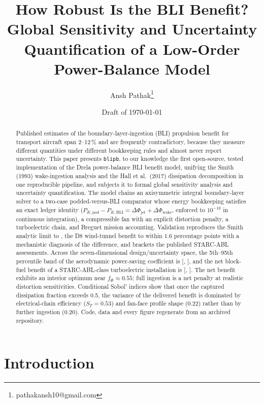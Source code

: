\documentclass[10pt]{article}
\title{How Robust Is the BLI Benefit?\\
\large Global Sensitivity and Uncertainty Quantification of a Low-Order
Power-Balance Model}
\author{Ansh Pathak\thanks{pathakansh10@gmail.com}}
\date{Draft of \today}
\begin{document}
\maketitle

\begin{abstract}
\noindent
Published estimates of the boundary-layer-ingestion (BLI) propulsion benefit
for transport aircraft span 2--12\,\% and are frequently contradictory,
because they measure different quantities under different bookkeeping rules
and almost never report uncertainty. This paper presents \texttt{blipb},
to our knowledge the first open-source, tested implementation of the Drela
power-balance BLI
benefit model, unifying the Smith (1993) wake-ingestion analysis and the
Hall et al.\ (2017) dissipation decomposition in one reproducible pipeline,
and subjects it to formal global sensitivity analysis and uncertainty
quantification. The model chains an axisymmetric integral boundary-layer
solver to a two-case podded-versus-BLI comparator whose energy bookkeeping
satisfies an exact ledger identity ($P_{K,\mathrm{pod}}-P_{K,\mathrm{BLI}}
=\Delta\Phi_{\mathrm{jet}}+\Delta\Phi_{\mathrm{wake}}$, enforced to
$10^{-10}$ in continuous integration), a compressible fan with an explicit
distortion penalty, a turboelectric chain, and Breguet mission accounting.
Validation reproduces the Smith analytic limit to \numSmithErr, the D8
wind-tunnel benefit to within 1.6 percentage points with a mechanistic
diagnosis of the difference, and brackets the published STARC-ABL
assessments. Across the seven-dimensional design/uncertainty space, the
5th--95th percentile band of the aerodynamic power-saving coefficient is
[\numUQPscPlo, \numUQPscPhi], and the net block-fuel benefit of a
STARC-ABL-class turboelectric installation is [\numUQFuelPlo,
\numUQFuelPhi]. The net benefit exhibits an interior optimum near
$f_\Phi\approx0.55$; full ingestion is a net penalty at realistic
distortion sensitivities. Conditional Sobol' indices show that once
the captured dissipation fraction exceeds 0.5, the variance of the
delivered benefit is dominated by electrical-chain efficiency
($S_T=0.53$) and fan-face profile shape (0.22) rather than by further
ingestion (0.20). Code, data and
every figure regenerate from an archived repository.
\end{abstract}

\section{Introduction}\label{sec:intro}
\end{document}
